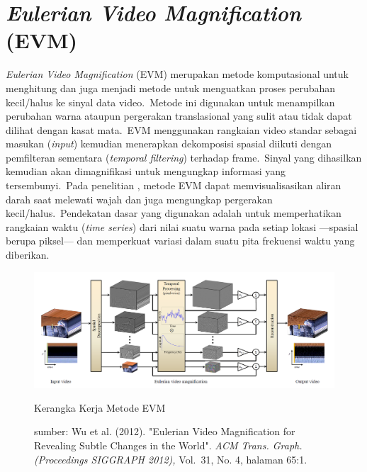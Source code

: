 
\section{\textit{Eulerian Video Magnification} (EVM)}

\textit{Eulerian Video Magnification} (EVM) merupakan metode komputasional untuk menghitung dan juga menjadi metode untuk menguatkan proses perubahan kecil/halus ke sinyal data video.~Metode ini digunakan untuk menampilkan perubahan warna ataupun pergerakan translasional yang sulit atau tidak dapat dilihat dengan kasat mata.~EVM menggunakan rangkaian video standar sebagai masukan (\textit{input}) kemudian menerapkan dekomposisi spasial diikuti dengan pemfilteran sementara (\textit{temporal filtering}) terhadap frame.~Sinyal yang dihasilkan kemudian akan dimagnifikasi untuk mengungkap informasi yang tersembunyi.~Pada penelitian \citet{Wu2012}, metode EVM dapat memvisualisasikan aliran darah saat melewati wajah dan juga mengungkap pergerakan kecil/halus.~Pendekatan dasar yang digunakan adalah untuk memperhatikan rangkaian waktu (\textit{time series}) dari nilai suatu warna pada setiap lokasi ---spasial berupa piksel--- dan memperkuat variasi dalam suatu pita frekuensi waktu yang diberikan.
\begin{figure}[ht]
	\centering
	\includegraphics[width=\textwidth]{EVM}
	\caption{Kerangka Kerja Metode EVM}
	\caption*{sumber: Wu et al. (2012). "Eulerian Video Magnification for Revealing Subtle Changes in the World". \textit{ACM Trans. Graph. (Proceedings SIGGRAPH 2012),} Vol.~31, No. 4, halaman 65:1.}
	\label{fig:EVM}   
\end{figure}


